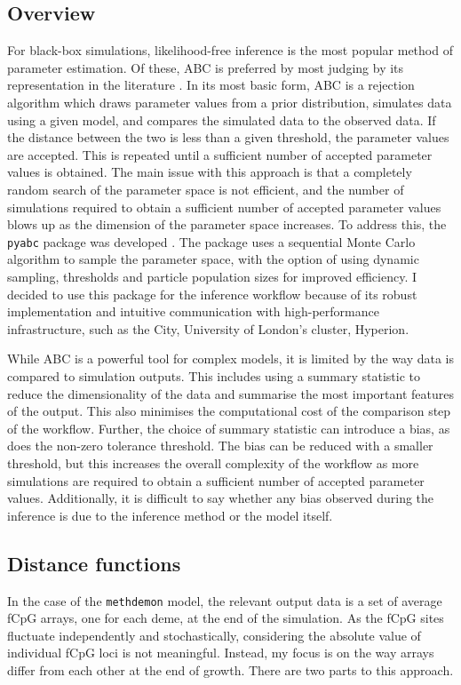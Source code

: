 \subsection{Overview}
For black-box simulations, likelihood-free inference is the most popular method
of parameter estimation. Of these, ABC is preferred by most judging by its
representation in the literature \cite{tavare_inferring_1997,
sottoriva_integrating_2010, sottoriva_big_2015, wang_calibration_2024,
bondi_approximate_2023}. In its most basic form, ABC is a rejection algorithm
which draws parameter values from a prior distribution, simulates data using a
given model, and compares the simulated data to the observed data. If the
distance between the two is less than a given threshold, the parameter values
are accepted. This is repeated until a sufficient number of accepted parameter
values is obtained. The main issue with this approach is that a completely
random search of the parameter space is not efficient, and the number of
simulations required to obtain a sufficient number of accepted parameter values
blows up as the dimension of the parameter space increases. To address this,
the \texttt{pyabc} package was developed \cite{klinger_pyabc_2018,
schalte_pyabc_2022}. The package uses a sequential Monte Carlo algorithm to
sample the parameter space, with the option of using dynamic sampling,
thresholds and particle population sizes for improved efficiency. I decided to
use this package for the inference workflow because of its robust
implementation and intuitive communication with high-performance
infrastructure, such as the City, University of London's cluster, Hyperion.\par
While ABC is a powerful tool for complex models, it is limited by the way data
is compared to simulation outputs. This includes using a summary statistic to
reduce the dimensionality of the data and summarise the most important features
of the output. This also minimises the computational cost of the comparison
step of the workflow. Further, the choice of summary statistic can introduce a
bias, as does the non-zero tolerance threshold. The bias can be reduced with a
smaller threshold, but this increases the overall complexity of the workflow as
more simulations are required to obtain a sufficient number of accepted
parameter values. Additionally, it is difficult to say whether any bias
observed during the inference is due to the inference method or the model
itself.

\subsection{Distance functions}
In the case of the \texttt{methdemon} model, the relevant output data is a set
of average fCpG arrays, one for each deme, at the end of the simulation. As the
fCpG sites fluctuate independently and stochastically, considering the absolute
value of individual fCpG loci is not meaningful. Instead, my focus is on the
way arrays differ from each other at the end of growth. There are two parts to
this approach.

